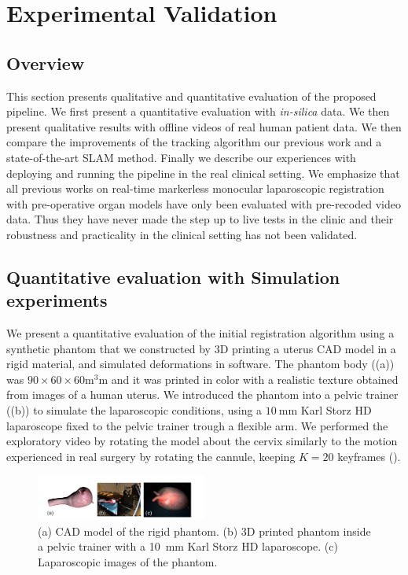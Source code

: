 
\section{Experimental Validation}
\label{sec:experiments}
\subsection{Overview}
This section presents qualitative and quantitative evaluation of the proposed pipeline. We first present a quantitative evaluation with \textit{in-silica} data. We then present qualitative results with offline videos of real human patient data. We then compare the improvements of the tracking algorithm \wrt our previous work and a state-of-the-art SLAM method. Finally we describe our experiences with deploying and running the pipeline in the real clinical setting. We emphasize that all previous works on real-time markerless monocular laparoscopic registration with pre-operative organ models have only been evaluated with pre-recoded video data. Thus they have never made the step up to live tests in the clinic and their robustness and practicality in the clinical setting has not been validated. 

\subsection{Quantitative evaluation with Simulation experiments}
We present a quantitative evaluation of the initial registration algorithm using a synthetic phantom that we constructed by 3D printing a uterus CAD model in a rigid material, and simulated deformations in software.
The phantom body ((a)) was $90 \times 60 \times 60\si{\cubic\milli\metre}$ and it was printed in color with a realistic texture obtained from images of a human uterus. We introduced the phantom into a pelvic trainer ((b)) to simulate the laparoscopic conditions, using a $\SI{10}{\milli\metre}$ Karl Storz HD laparoscope fixed to the pelvic trainer trough a flexible arm. We performed the exploratory video by rotating the model about the cervix similarly to the motion experienced in real surgery by rotating the cannule, keeping $K=20$ keyframes ().
 
\begin{figure}[htb]
  \centering
  \includegraphics[width=0.5\textwidth]{./figs/phantom.pdf}
\caption{(a) CAD model of the rigid phantom. (b) 3D printed phantom inside a pelvic trainer with a \SI{10}{\milli\metre} Karl Storz HD laparoscope. (c) Laparoscopic images of the phantom.}
\label{fig:phantom}
\end{figure}


